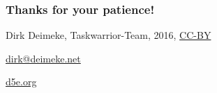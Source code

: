 \documentclass[t,handout]{beamer}
\begin{document}
\begin{frame}[fragile]\frametitle{Thanks for your patience!}
    \vfill
    \begin{center}
        Dirk Deimeke, Taskwarrior-Team, 2016, \href{https://creativecommons.org/licenses/by/4.0/}{CC-BY}

        \href{mailto:dirk@deimeke.net}{dirk@deimeke.net}

        \href{https://d5e.org/}{d5e.org}
    \end{center}
\end{frame}
\end{document}
